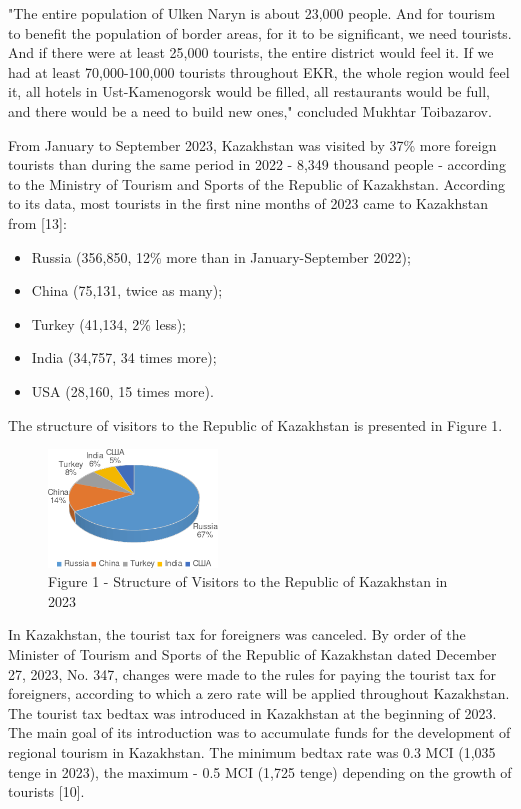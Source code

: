 \begin{multicols}{2}
"The entire population of Ulken Naryn is about 23,000 people. And for
tourism to benefit the population of border areas, for it to be
significant, we need tourists. And if there were at least 25,000
tourists, the entire district would feel it. If we had at least
70,000-100,000 tourists throughout EKR, the whole region would feel it,
all hotels in Ust-Kamenogorsk would be filled, all restaurants would be
full, and there would be a need to build new ones," concluded Mukhtar
Toibazarov.

From January to September 2023, Kazakhstan was visited by 37\% more
foreign tourists than during the same period in 2022 - 8,349 thousand
people - according to the Ministry of Tourism and Sports of the Republic
of Kazakhstan. According to its data, most tourists in the first nine
months of 2023 came to Kazakhstan from {[}13{]}:

\begin{itemize}
\item
  Russia (356,850, 12\% more than in January-September 2022);
\item
  China (75,131, twice as many);
\item
  Turkey (41,134, 2\% less);
\item
  India (34,757, 34 times more);
\item
  USA (28,160, 15 times more).
\end{itemize}

The structure of visitors to the Republic of Kazakhstan is presented in
Figure 1.

\begin{figure}[H]
	\centering
	\includegraphics[width=0.4\textwidth]{assets/340.2}
	\caption*{Figure 1 - Structure of Visitors to the Republic of Kazakhstan in 2023}
\end{figure}

In Kazakhstan, the tourist tax for foreigners was canceled. By order of
the Minister of Tourism and Sports of the Republic of Kazakhstan dated
December 27, 2023, No. 347, changes were made to the rules for paying
the tourist tax for foreigners, according to which a zero rate will be
applied throughout Kazakhstan. The tourist tax bedtax was introduced in
Kazakhstan at the beginning of 2023. The main goal of its introduction
was to accumulate funds for the development of regional tourism in
Kazakhstan. The minimum bedtax rate was 0.3 MCI (1,035 tenge in 2023),
the maximum - 0.5 MCI (1,725 tenge) depending on the growth of tourists
{[}10{]}.


\end{multicols}
